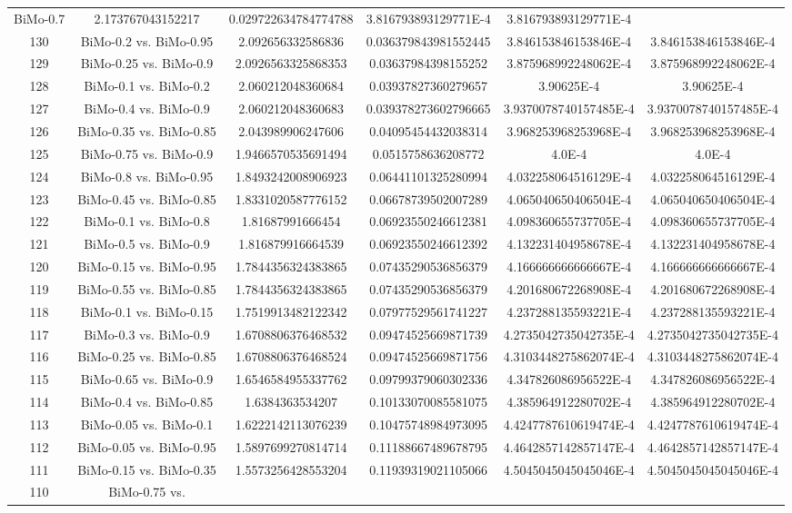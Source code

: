 \documentclass[a4paper,10pt]{article}
\begin{document}
\begin{landscape}
\begin{table}[!htp]
\begin{tabular}{cccccc}
BiMo-0.7&2.173767043152217&0.029722634784774788&3.816793893129771E-4&3.816793893129771E-4\\130&BiMo-0.2 vs. BiMo-0.95&2.092656332586836&0.036379843981552445&3.846153846153846E-4&3.846153846153846E-4\\129&BiMo-0.25 vs. BiMo-0.9&2.0926563325868353&0.03637984398155252&3.875968992248062E-4&3.875968992248062E-4\\128&BiMo-0.1 vs. BiMo-0.2&2.060212048360684&0.03937827360279657&3.90625E-4&3.90625E-4\\127&BiMo-0.4 vs. BiMo-0.9&2.060212048360683&0.039378273602796665&3.9370078740157485E-4&3.9370078740157485E-4\\126&BiMo-0.35 vs. BiMo-0.85&2.043989906247606&0.04095454432038314&3.968253968253968E-4&3.968253968253968E-4\\125&BiMo-0.75 vs. BiMo-0.9&1.9466570535691494&0.0515758636208772&4.0E-4&4.0E-4\\124&BiMo-0.8 vs. BiMo-0.95&1.8493242008906923&0.06441101325280994&4.032258064516129E-4&4.032258064516129E-4\\123&BiMo-0.45 vs. BiMo-0.85&1.8331020587776152&0.06678739502007289&4.065040650406504E-4&4.065040650406504E-4\\122&BiMo-0.1 vs. BiMo-0.8&1.81687991666454&0.06923550246612381&4.098360655737705E-4&4.098360655737705E-4\\121&BiMo-0.5 vs. BiMo-0.9&1.816879916664539&0.06923550246612392&4.132231404958678E-4&4.132231404958678E-4\\120&BiMo-0.15 vs. BiMo-0.95&1.7844356324383865&0.07435290536856379&4.166666666666667E-4&4.166666666666667E-4\\119&BiMo-0.55 vs. BiMo-0.85&1.7844356324383865&0.07435290536856379&4.201680672268908E-4&4.201680672268908E-4\\118&BiMo-0.1 vs. BiMo-0.15&1.7519913482122342&0.07977529561741227&4.237288135593221E-4&4.237288135593221E-4\\117&BiMo-0.3 vs. BiMo-0.9&1.6708806376468532&0.09474525669871739&4.2735042735042735E-4&4.2735042735042735E-4\\116&BiMo-0.25 vs. BiMo-0.85&1.6708806376468524&0.09474525669871756&4.3103448275862074E-4&4.3103448275862074E-4\\115&BiMo-0.65 vs. BiMo-0.9&1.6546584955337762&0.09799379060302336&4.347826086956522E-4&4.347826086956522E-4\\114&BiMo-0.4 vs. BiMo-0.85&1.6384363534207&0.10133070085581075&4.385964912280702E-4&4.385964912280702E-4\\113&BiMo-0.05 vs. BiMo-0.1&1.6222142113076239&0.10475748984973095&4.4247787610619474E-4&4.4247787610619474E-4\\112&BiMo-0.05 vs. BiMo-0.95&1.5897699270814714&0.11188667489678795&4.4642857142857147E-4&4.4642857142857147E-4\\111&BiMo-0.15 vs. BiMo-0.35&1.5573256428553204&0.11939319021105066&4.5045045045045046E-4&4.5045045045045046E-4\\110&BiMo-0.75 vs. 
\end{tabular}
\end{table}
\end{landscape}
\end{document}
